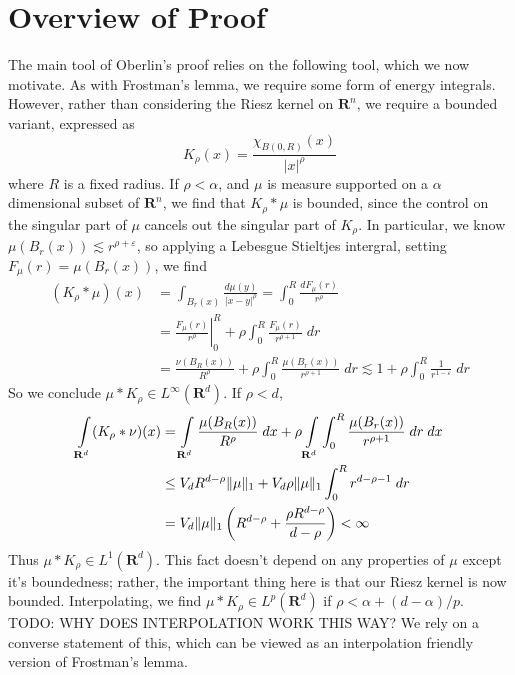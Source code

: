 \documentclass{article}
\theoremstyle{plain}
\theoremstyle{remark}
\theoremstyle{definition}
\begin{document}
\section{Overview of Proof}

The main tool of Oberlin's proof relies on the following tool, which we now motivate. As with Frostman's lemma, we require some form of energy integrals. However, rather than considering the Riesz kernel on $\mathbf{R}^n$, we require a bounded variant, expressed as
%
\[ K_\rho(x) = \frac{\chi_{B(0,R)}(x)}{|x|^\rho} \]
%
where $R$ is a fixed radius. If $\rho < \alpha$, and $\mu$ is measure supported on a $\alpha$ dimensional subset of $\mathbf{R}^n$, we find that $K_\rho * \mu$ is bounded, since the control on the singular part of $\mu$ cancels out the singular part of $K_\rho$. In particular, we know $\mu(B_r(x)) \lesssim r^{\rho + \varepsilon}$, so applying a Lebesgue Stieltjes intergral, setting $F_\mu(r) = \mu(B_r(x))$, we find
%
\begin{align*}
	(K_\rho * \mu)(x) &= \int_{B_r(x)} \frac{d\mu(y)}{|x - y|^\rho} = \int_0^R \frac{dF_\mu(r)}{r^\rho} \\
	&= \left. \frac{F_\mu(r)}{r^\rho} \right|_0^R + \rho \int_0^R \frac{F_\mu(r)}{r^{\rho + 1}}\; dr\\
	&= \frac{\nu(B_R(x))}{R^\rho} + \rho \int_0^R \frac{\mu(B_r(x))}{r^{\rho + 1}}\; dr \lesssim 1 + \rho \int_0^R \frac{1}{r^{1 - \varepsilon}}\; dr
\end{align*}
%
So we conclude $\mu * K_\rho \in L^\infty(\mathbf{R}^d)$. If $\rho < d$,
%
\begin{align*}
	\int\displaylimits_{\mathbf{R}^d} (K_\rho * \nu)(x) &= \int\displaylimits_{\mathbf{R}^d} \frac{\mu(B_R(x))}{R^{\rho}} \; dx + \rho \int\displaylimits_{\mathbf{R}^d} \int_0^R \frac{\mu(B_r(x))}{r^{\rho + 1}}\; dr\; dx\\
	&\leq V_d R^{d-\rho} \| \mu \|_1 + V_d \rho \| \mu \|_1 \int_0^R r^{d - \rho - 1}\; dr\\
	&= V_d \| \mu \|_1 \left( R^{d-\rho} + \frac{\rho R^{d-\rho}}{d - \rho} \right) < \infty
\end{align*}
%
Thus $\mu * K_\rho \in L^1(\mathbf{R}^d)$. This fact doesn't depend on any properties of $\mu$ except it's boundedness; rather, the important thing here is that our Riesz kernel is now bounded. Interpolating, we find $\mu * K_\rho \in L^p(\mathbf{R}^d)$ if $\rho < \alpha + (d - \alpha)/p$. TODO: WHY DOES INTERPOLATION WORK THIS WAY? We rely on a converse statement of this, which can be viewed as an interpolation friendly version of Frostman's lemma.
\end{document}
